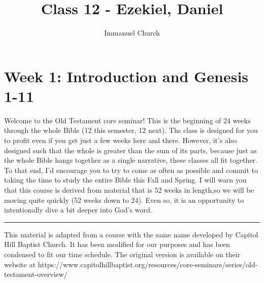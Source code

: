 \documentclass[12pt,]{article}
\title{Class 12 - Ezekiel, Daniel}
\author{Immanuel Church}
\date{}
\begin{document}
      
    \maketitle
    
      
  \hypertarget{week-1-introduction-and-genesis-1-11}{%
\section{Week 1: Introduction and Genesis
1-11}\label{week-1-introduction-and-genesis-1-11}}

Welcome to the Old Testament core seminar! This is the beginning of 24
weeks through the whole Bible (12 this semester, 12 next). Ths class is
designed for you to profit even if you get just a few weeks here and
there. However, it's also designed such that the whole is greater than
the sum of its parts, because just as the whole Bible hangs together as
a single narrative, these classes all fit together. To that end, I'd
encourage you to try to come as often as possible and commit to taking
the time to study the entire Bible this Fall and Spring. I will warn you
that this course is derived from material that is 52 weeks in length,so
we will be moving quite quickly (52 weeks down to 24). Even so, it is an
opportunity to intentionally dive a bit deeper into God's word.



\bigbreak

\noindent\rule{\textwidth}{1pt}

\scriptsize{This material is adapted from a course with the same name developed by Capitol Hill Baptist Church. It has been modified for our purposes and has been condensed to fit our time schedule. The original version is available on their website at https://www.capitolhillbaptist.org/resources/core-seminars/series/old-testament-overview/}

\end{document}

